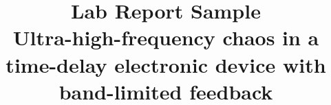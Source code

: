 \documentclass[aps,twocolumn,pre,nofootinbib]{revtex4}
\begin{document}
%
%
%

  \newcommand{\breite}{1.0} %

\newtheorem{prop}{Proposition}
\newtheorem{cor}{Corollary}

\newcommand{\be}{\begin{equation}}
\newcommand{\ee}{\end{equation}}

\newcommand{\bea}{\begin{eqnarray}}
\newcommand{\eea}{\end{eqnarray}}

\newcommand{\Reals}{\mathbb{R}}     %
\newcommand{\Com}{\mathbb{C}}       %
\newcommand{\Nat}{\mathbb{N}}       %


\newcommand{\id}{\mathbbm{1}}    

\newcommand{\Real}{\mathop{\mathrm{Re}}}
\newcommand{\Imag}{\mathop{\mathrm{Im}}}

\def\O{\mbox{$\mathcal{O}$}}   %
\def\F{\mathcal{F}}			%
\def\sgn{\text{sgn}}

\newcommand{\dw}{\ensuremath{\Delta}}
\newcommand{\wbp}{\ensuremath{\omega_0}}
\newcommand{\dv}{\ensuremath{\delta}}
\newcommand{\vbp}{\ensuremath{\nu_0}}
\newcommand{\vplus}{\ensuremath{\nu_{+}}}
\newcommand{\vminus}{\ensuremath{\nu_{-}}}
\newcommand{\wplus}{\ensuremath{\omega_{+}}}
\newcommand{\wminus}{\ensuremath{\omega_{-}}}


\title{Lab Report Sample \\ Ultra-high-frequency chaos in a time-delay electronic device with band-limited feedback}



\end{document}
